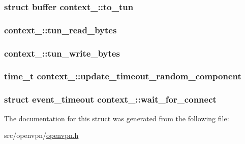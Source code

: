 \subsubsection[{to\+\_\+tun}]{\setlength{\rightskip}{0pt plus 5cm}struct {\bf buffer} context\+\_\+::to\+\_\+tun}\label{structcontext__2_a913dbf251774ae01f77289e5a4965704}
\hypertarget{structcontext__2_a3fe8f226d4b9bf0a3831ed6f6c81c38a}{}
\subsubsection[{tun\+\_\+read\+\_\+bytes}]{ context\+\_\+::tun\+\_\+read\+\_\+bytes}\label{structcontext__2_a3fe8f226d4b9bf0a3831ed6f6c81c38a}
\hypertarget{structcontext__2_aa3cc7c13e7812c3f71dba0bbdd46ff55}{}
\subsubsection[{tun\+\_\+write\+\_\+bytes}]{ context\+\_\+::tun\+\_\+write\+\_\+bytes}\label{structcontext__2_aa3cc7c13e7812c3f71dba0bbdd46ff55}
\hypertarget{structcontext__2_a20e59bdf436934540ff063e22d71d649}{}
\subsubsection[{update\+\_\+timeout\+\_\+random\+\_\+component}]{\setlength{\rightskip}{0pt plus 5cm}time\+\_\+t context\+\_\+::update\+\_\+timeout\+\_\+random\+\_\+component}\label{structcontext__2_a20e59bdf436934540ff063e22d71d649}
\hypertarget{structcontext__2_a6e148857a12de912aef0d3476a85baea}{}
\subsubsection[{wait\+\_\+for\+\_\+connect}]{\setlength{\rightskip}{0pt plus 5cm}struct {\bf event\+\_\+timeout} context\+\_\+::wait\+\_\+for\+\_\+connect}\label{structcontext__2_a6e148857a12de912aef0d3476a85baea}


The documentation for this struct was generated from the following file\+:\begin{DoxyCompactItemize}
\item 
src/openvpn/\hyperlink{openvpn_8h}{openvpn.\+h}\end{DoxyCompactItemize}
